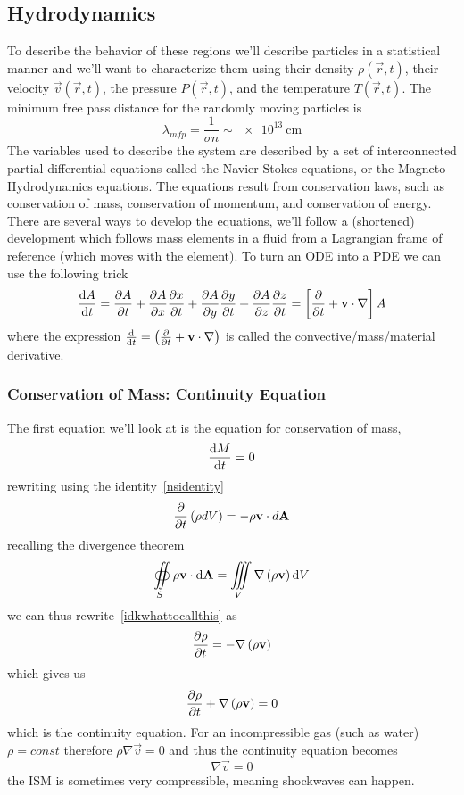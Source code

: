 \subsection{Hydrodynamics}
To describe the behavior of these regions we'll describe particles in a statistical manner and we'll want to characterize them using their density \(\rho(\vec{r},t)\), their velocity \(\vec{v}(\vec{r},t)\), the pressure \(P(\vec{r},t)\), and the temperature \(T(\vec{r},t)\). The minimum free pass distance for the randomly moving particles is
\begin{equation}
    \lambda_{mfp} = \frac{1}{\sigma n} \sim \qty{e13}{\centi\meter}
\end{equation}
The variables used to describe the system are described by a set of interconnected partial differential equations called the Navier-Stokes equations, or the Magneto-Hydrodynamics equations. The equations result from conservation laws, such as conservation of mass, conservation of momentum, and conservation of energy. There are several ways to develop the equations, we'll follow a (shortened) development which follows mass elements in a fluid from a Lagrangian frame of reference (which moves with the element). To turn an ODE into a PDE we can use the following trick
\begin{equation}\label{nsidentity}
    \diff{A}{t} = \diffp{A}{t} + \diffp{A}{x}\diffp{x}{t} + \diffp{A}{y}\diffp{y}{t} + \diffp{A}{z}\diffp{z}{t} = \left[\diffp{}{t}+\vec{v}\cdot\vec{\nabla}\right]A
\end{equation}
where the expression \(\diff{}{t}=\ins{\diffp{}{t}+\vec{v}\cdot\nabla}\) is called the convective/mass/material derivative. 
\subsubsection{Conservation of Mass: Continuity Equation}
The first equation we'll look at is the equation for conservation of mass,
\begin{equation}
    \diff{M}{t}=0
\end{equation}
rewriting using the identity~\ref{nsidentity} 
\begin{equation}\label{idkwhattocallthis}
    \diffp{}{t}\ins{\rho dV} = -\rho \vec{v}\cdot d\vec{A}
\end{equation}
recalling the divergence theorem
\begin{equation}
    \oiint\limits_S \rho\mathbf{v}\cdot\mathop{}\!\mathrm{d}\mathbf{A} = \iiint\limits_V \nabla\left(\rho\mathbf{v}\right)\mathop{}\!\mathrm{d} V
\end{equation}
we can thus rewrite~\ref{idkwhattocallthis} as
\begin{equation}
    \diffp{\rho}{t} = -\nabla\ins{\rho\vec{v}}
\end{equation}
which gives us
\begin{equation}
    \diffp{\rho}{t} + \nabla\ins{\rho\vec{v}} =0
\end{equation}
which is the continuity equation. For an incompressible gas (such as water) \(\rho = const\) therefore \(\rho\nabla\vec{v}=0\) and thus the continuity equation becomes
\begin{equation}
    \nabla\vec{v}=0
\end{equation}
the ISM is sometimes very compressible, meaning shockwaves can happen.